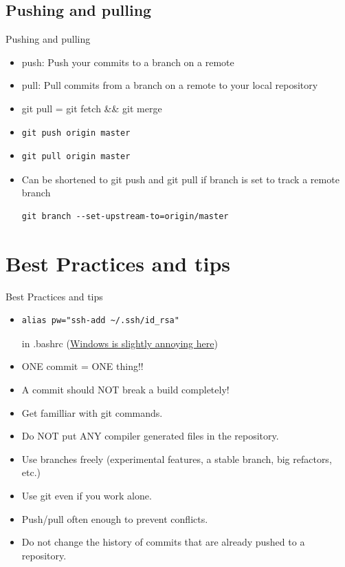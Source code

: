 \documentclass[10pt,a4paper]{beamer}
\begin{document}
\subsection{Pushing and pulling}
\begin{frame}[fragile]{Pushing and pulling}
\begin{itemize}
\item push: Push your commits to a branch on a remote
\item pull: Pull commits from a branch on a remote to your local repository
\item git pull = git fetch \&\& git merge
\item \begin{verbatim}git push origin master\end{verbatim}
\item \begin{verbatim}git pull origin master\end{verbatim}
\item Can be shortened to git push and git pull if branch is set to track a remote branch
\begin{verbatim}git branch --set-upstream-to=origin/master\end{verbatim}
\end{itemize}
\end{frame}


\section{Best Practices and tips}
\begin{frame}[fragile]{Best Practices and tips}
\pause
\begin{itemize}
\item \begin{verbatim}alias pw="ssh-add ~/.ssh/id_rsa"\end{verbatim} 
in .bashrc (\href{http://stackoverflow.com/questions/3669001/getting-ssh-agent-to-work-with-git-run-from-windows-command-shell/15870387#15870387}{\color{blue}Windows is slightly annoying here})
\pause
\item ONE commit = ONE thing!!
\pause
\item A commit should NOT break a build completely!
\pause
\item Get familliar with git commands.
\pause
\item Do NOT put ANY compiler generated files in the repository.
\pause
\item Use branches freely (experimental features, a stable branch, big refactors, etc.)
\pause
\item Use git even if you work alone.
\pause
\item Push/pull often enough to prevent conflicts.
\pause
\item Do not change the history of commits that are already pushed to a repository.
\end{itemize}
\end{frame}
\end{document}
